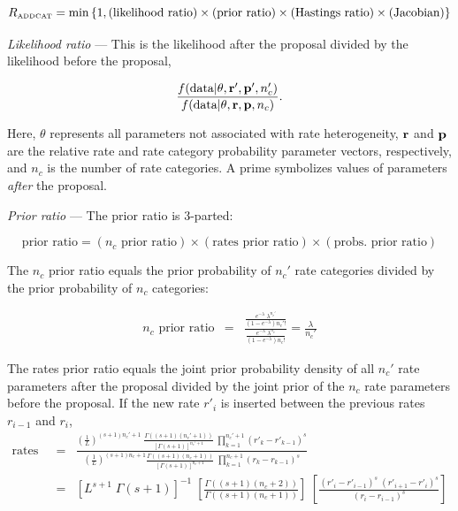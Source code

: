 \documentclass[12pt]{article}
\newcommand{\ncat}{n_c}
\begin{document}
\[ R_{\mbox{\tiny ADDCAT}} = \min \left\{1, (\mbox{likelihood ratio}) \times (\mbox{prior ratio}) \times (\mbox{Hastings ratio}) \times (\mbox{Jacobian}) \right\} \]

{\em Likelihood ratio} --- This is the likelihood after the proposal divided by the likelihood before the proposal,

\[ \frac{f(\mbox{data} | {\bf \theta}, {\bf r}', {\bf p}', \ncat')}{f(\mbox{data} | {\bf \theta}, {\bf r}, {\bf p}, \ncat)}. \]

Here, $\theta$ represents all parameters not associated with rate heterogeneity, $\bf r$ and $\bf p$ are the relative rate and rate category probability parameter vectors, respectively, and $\ncat$ is the number of rate categories. A prime symbolizes values of parameters {\em after} the proposal.

{\em Prior ratio} --- The prior ratio is 3-parted:

\[ \mbox{prior ratio} = (\mbox{$\ncat$ prior ratio}) \times (\mbox{rates prior ratio}) \times (\mbox{probs. prior ratio}) \]

The $\ncat$ prior ratio equals the prior probability of $\ncat'$ rate categories divided by the prior probability of $\ncat$ categories:

\begin{eqnarray*}
\mbox{$\ncat$ prior ratio} & = & \frac{\frac{e^{-\lambda} \; \lambda^{\ncat'}}{\left( 1 - e^{-\lambda} \right) {\ncat'}!}}{\frac{e^{-\lambda} \; \lambda^{\ncat}}{\left( 1 - e^{-\lambda} \right) {\ncat}!}} =  \frac{\lambda}{\ncat'}
\end{eqnarray*}

The rates prior ratio equals the joint prior probability density of all $\ncat'$ rate parameters after the proposal divided by the joint prior of the $\ncat$ rate parameters before the proposal. If the new rate $r'_i$ is inserted between the previous rates $r_{i-1}$ and $r_i$,
\begin{eqnarray*}
\mbox{rates prior ratio} 
  & = & \frac
  {
    \left( \frac{1}{L} \right)^{(s+1) \ncat' + 1} \; 
    \frac{ \Gamma\left( (s+1) (\ncat' + 1) \right) }{ \left[ \Gamma(s+1) \right]^{\ncat' + 1} } \;
    \prod_{k=1}^{\ncat' + 1} ({r'}_k - {r'}_{k-1})^s
  }
  {
    \left( \frac{1}{L} \right)^{(s+1) \ncat + 1}
    \frac{ \Gamma\left( (s+1) (\ncat + 1) \right) }{ \left[ \Gamma(s+1) \right]^{\ncat + 1} } \;
    \prod_{k=1}^{\ncat + 1} (r_k - r_{k-1})^s
  } \\
  & = & \left[ L^{s+1} \; \Gamma(s+1)\right]^{-1} \; 
  \left[ \frac{\Gamma\left( (s+1) (\ncat + 2) \right)}{\Gamma\left( (s+1) (\ncat + 1) \right)} \right] \;
  \left[ \frac{(r'_i - r'_{i-1})^s \; (r'_{i+1} - r'_i)^s}{(r_i - r_{i-1})^s} \right]
\end{eqnarray*}
\end{document}
